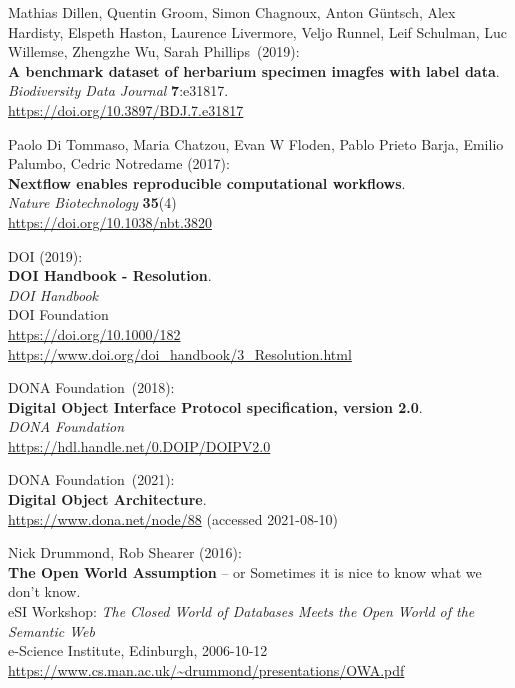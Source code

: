 \begin{thebibliography}{9}
Mathias Dillen, Quentin Groom, Simon Chagnoux, Anton Güntsch, Alex Hardisty, Elspeth Haston, Laurence Livermore, Veljo Runnel, Leif Schulman, Luc Willemse, Zhengzhe Wu, Sarah Phillips~(2019):\\
\textbf{A benchmark dataset of herbarium specimen imagfes with label data}.\\
\emph{Biodiversity Data Journal} \textbf{7}:e31817.\\
\url{https://doi.org/10.3897/BDJ.7.e31817}

Paolo Di Tommaso, Maria Chatzou, Evan W Floden, Pablo Prieto Barja, Emilio Palumbo, Cedric Notredame (2017):\\
\textbf{Nextflow enables reproducible computational workflows}.\\
\emph{Nature Biotechnology} \textbf{35}(4) \\
\url{https://doi.org/10.1038/nbt.3820}

DOI (2019): \\
\textbf{{DOI Handbook} - {Resolution}}. \\
\emph{{DOI Handbook}}\\
DOI Foundation\\
\url{https://doi.org/10.1000/182}\\
\url{https://www.doi.org/doi_handbook/3_Resolution.html}

DONA Foundation~(2018):\\
\textbf{Digital Object Interface Protocol specification, version 2.0}.\\
\emph{DONA Foundation}\\
\url{https://hdl.handle.net/0.DOIP/DOIPV2.0}

DONA Foundation~(2021):\\
\textbf{Digital Object Architecture}.\\
\url{https://www.dona.net/node/88} (accessed 2021-08-10)

Nick Drummond, Rob Shearer (2016):\\
\textbf{The Open World Assumption} -- or Sometimes it is nice to know what we don't know.\\
eSI Workshop: \emph{The Closed World of Databases Meets the Open World of the Semantic Web}\\
e-Science Institute, Edinburgh, 2006-10-12\\
\url{https://www.cs.man.ac.uk/~drummond/presentations/OWA.pdf}


\end{thebibliography}
